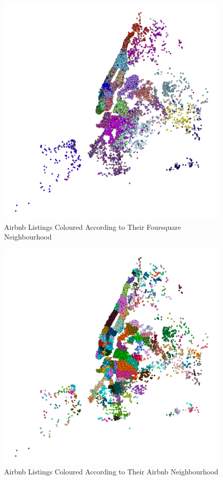 \begin{figure}
\centering
\includegraphics[width=\columnwidth]{../foo_3.png}
\caption{Airbnb Listings Coloured According to Their Foursquare Neighbourhood}
\label{fig:abnb-comm}
\end{figure}
\begin{figure}
\centering
\includegraphics[width=\columnwidth]{../nbh_foo.png}
\caption{Airbnb Listings Coloured According to Their Airbnb Neighbourhood}
\label{fig:abnb-nbh}
\end{figure}
